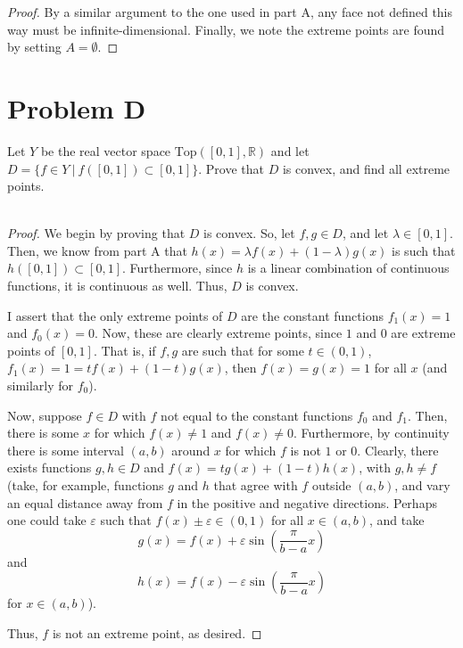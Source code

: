 \documentclass[fontsize=11pt]{scrartcl} %
\numberwithin{equation}{section} %
\numberwithin{figure}{section} %
\numberwithin{table}{section} %
\newcommand{\R}{\mathbb{R}}
\begin{document}
\begin{proof}
    By a similar argument to the one used in part A, any face not defined this
    way must be infinite-dimensional. Finally, we note the extreme points are
    found by setting $A=\emptyset$.
\end{proof}

\newpage

\section*{Problem D}
Let $Y$ be the real vector space $\text{Top}([0,1],\R)$ and let $D=\{f\in Y\ |\
f([0,1])\subset [0,1]\}$. Prove that $D$ is convex, and find all extreme
points.
\\
\\
\begin{proof}
    We begin by proving that $D$ is convex. So, let $f,g\in D$, and let
    $\lambda\in[0,1]$. Then, we know from part A that $h(x) = \lambda
    f(x)+(1-\lambda)g(x)$ is such that $h([0,1])\subset [0,1]$. Furthermore,
    since $h$ is a linear combination of continuous functions, it is continuous
    as well. Thus, $D$ is convex.

    I assert that the only extreme points of $D$ are the constant functions
    $f_1(x) = 1$ and $f_0(x) = 0$. Now, these are clearly extreme points, since
    $1$ and $0$ are extreme points of $[0,1]$. That is, if $f,g$ are such that
    for some $t\in (0,1)$, $f_1(x)=1 = tf(x) + (1-t)g(x)$, then $f(x) = g(x) =
    1$ for all $x$ (and similarly for $f_0$).

    Now, suppose $f\in D$ with $f$ not equal to the constant functions $f_0$ and
    $f_1$. Then, there is some $x$ for which $f(x)\neq 1$ and $f(x)\neq 0$.
    Furthermore, by continuity there is some interval $(a,b)$ around $x$ for
    which $f$ is not $1$ or $0$. Clearly, there exists functions $g,h\in D$
    and $f(x) = tg(x) + (1-t)h(x)$, with $g,h\neq f$ (take, for example,
        functions $g$ and $h$ that agree with $f$ outside $(a,b)$, and vary an
        equal distance away from $f$ in the positive and negative directions.
        Perhaps one could take $\varepsilon$ such that $f(x)\pm \varepsilon\in
        (0,1)$ for all $x\in (a,b)$, and take 
        \[
            g(x) = f(x)+\varepsilon\sin(\frac{\pi}{b-a}x)
        \]
        and 
        \[
            h(x) = f(x)-\varepsilon\sin(\frac{\pi}{b-a}x)
        \]
    for $x\in (a,b)$).
    
    Thus, $f$ is not an
    extreme point, as desired.
\end{proof}
\end{document}
